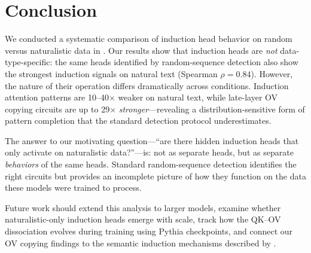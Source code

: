 \section{Conclusion}
\label{sec:conclusion}

We conducted a systematic comparison of induction head behavior on random versus naturalistic data in \gpttwo.
Our results show that induction heads are \emph{not} data-type-specific: the same heads identified by random-sequence detection also show the strongest induction signals on natural text (Spearman $\rho = 0.84$).
However, the nature of their operation differs dramatically across conditions.
Induction attention patterns are 10--40$\times$ weaker on natural text, while late-layer OV copying circuits are up to 29$\times$ \emph{stronger}---revealing a distribution-sensitive form of pattern completion that the standard detection protocol underestimates.

The answer to our motivating question---``are there hidden induction heads that only activate on naturalistic data?''---is: not as separate heads, but as separate \emph{behaviors} of the same heads.
Standard random-sequence detection identifies the right circuits but provides an incomplete picture of how they function on the data these models were trained to process.

Future work should extend this analysis to larger models, examine whether naturalistic-only induction heads emerge with scale, track how the QK--OV dissociation evolves during training using Pythia checkpoints, and connect our OV copying findings to the semantic induction mechanisms described by \citet{ren2024identifying}.
